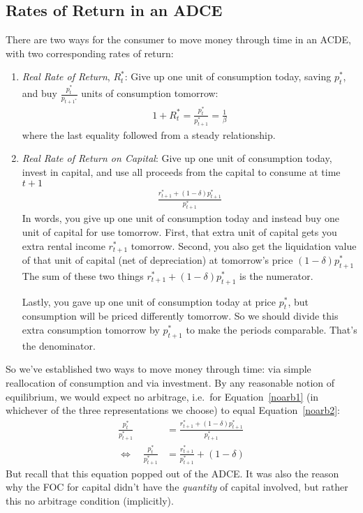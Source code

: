 \documentclass[12pt]{article}
\theoremstyle{plain}
\theoremstyle{definition}
\theoremstyle{remark}
\begin{document}
\subsection{Rates of Return in an ADCE}

There are two ways for the consumer to move money through time in an
ACDE, with two corresponding rates of return:
\begin{enumerate}
  \item \emph{Real Rate of Return}, $R_t^*$: Give up one unit of
    consumption today, saving $p_t^*$, and buy $\frac{p_t^*}{p_{t+1^*}}$
    units of consumption tomorrow:
    \begin{align}
      1+R_t^* = \frac{p_t^*}{p_{t+1}^*} = \frac{1}{\beta}
      \label{noarb1}
    \end{align}
    where the last equality followed from a steady relationship.

  \item \emph{Real Rate of Return on Capital}: Give up one unit of
    consumption today, invest in capital, and use all proceeds from the
    capital to consume at time $t+1$
    \begin{align}
      \frac{r_{t+1}^* + (1-\delta)p_{t+1}^*}{p_{t+1}^*}
      \label{noarb2}
    \end{align}
    In words, you give up one unit of consumption today and instead buy
    one unit of capital for use tomorrow.
    First, that extra unit of capital gets you extra rental income
    $r_{t+1}^*$ tomorrow.
    Second, you also get the liquidation value of that unit of capital
    (net of depreciation) at tomorrow's price $(1-\delta)p_{t+1}^*$
    The sum of these two things $r_{t+1}^* + (1-\delta)p_{t+1}^*$ is the
    numerator.

    Lastly, you gave up one unit of consumption today at price $p_t^*$,
    but consumption will be priced differently tomorrow.  So we should
    divide this extra consumption tomorrow by $p_{t+1}^*$ to make the
    periods comparable. That's the denominator.
\end{enumerate}
So we've established two ways to move money through time: via simple
reallocation of consumption and via investment. By any reasonable notion
of equilibrium, we would expect no arbitrage, i.e.\ for
Equation~\ref{noarb1} (in whichever of the three representations we
choose) to equal Equation~\ref{noarb2}:
\begin{align*}
  \frac{p_t^*}{p_{t+1}^*}
  &=
  \frac{r_{t+1}^* + (1-\delta)p_{t+1}^*}{p_{t+1}^*} \\
  \Leftrightarrow\quad
  \frac{p_t^*}{p_{t+1}^*}
  &=
  \frac{r_{t+1}^*}{p_{t+1}^*} + (1-\delta)
\end{align*}
But recall that this equation popped out of the ADCE. It was also the
reason why the FOC for capital didn't have the \emph{quantity} of
capital involved, but rather this no arbitrage condition (implicitly).
\end{document}
